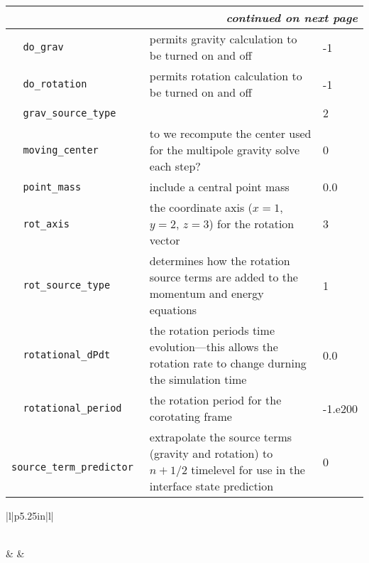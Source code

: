 \begin{landscape}
{\begin{center}
\begin{longtable}{|l|p{5.25in}|l|}
\multicolumn{3}{|r|}{{\em continued on next page}} \\ \hline
\endfoot

\hline 
\endlastfoot


\rowcolor{tableShade}
\verb=  do_grav  = &   permits gravity calculation to be turned on and off  &  -1 \\
\verb=  do_rotation  = &   permits rotation calculation to be turned on and off  &  -1 \\
\rowcolor{tableShade}
\verb=  grav_source_type  = &    &  2 \\
\verb=  moving_center  = &   to we recompute the center used for the multipole gravity solve each step?  &  0 \\
\rowcolor{tableShade}
\verb=  point_mass  = &   include a central point mass  &  0.0 \\
\verb=  rot_axis  = &   the coordinate axis ($x=1$, $y=2$, $z=3$) for the rotation vector  &  3 \\
\rowcolor{tableShade}
\verb=  rot_source_type  = &   determines how the rotation source terms are added to the momentum and energy equations  &  1 \\
\verb=  rotational_dPdt  = &   the rotation periods time evolution---this allows the rotation rate to change durning the simulation time  &  0.0 \\
\rowcolor{tableShade}
\verb=  rotational_period  = &   the rotation period for the corotating frame  &  -1.e200 \\
\verb=  source_term_predictor  = &   extrapolate the source terms (gravity and rotation) to $n+1/2$ timelevel for use in the interface state prediction  &  0 \\


\end{longtable}
\end{center}

} %


{\small

\renewcommand{\arraystretch}{1.5}
%
\begin{center}
\begin{longtable}{|l|p{5.25in}|l|}
\caption[ hydrodynamics
 parameters.]{ hydrodynamics
 parameters.} \label{table:  hydrodynamics
 parameters. runtime} \\
%
\hline {} & 
        & 
        \\ \hline 
\endfirsthead


\end{longtable}
\end{center}}
\end{landscape}

